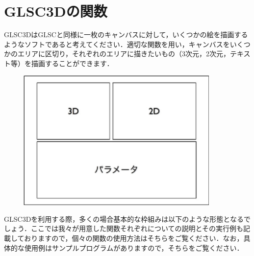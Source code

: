 \documentclass[platex,a4paper,12pt]{jsarticle}%
\begin{document}

\newpage
\section{GLSC3Dの関数}

GLSC3DはGLSCと同様に一枚のキャンバスに対して，いくつかの絵を描画するようなソフトであると考えてください．適切な関数を用い，キャンバスをいくつかのエリアに区切り，それぞれのエリアに描きたいもの（3次元，2次元，テキスト等）を描画することができます．
\begin{figure}[htb]
\centering
\includegraphics[width=100mm]{./Figures/eps/Canvas_kansu_gaiyo.eps}
\end{figure}

GLSC3Dを利用する際，多くの場合基本的な枠組みは以下のような形態となるでしょう．ここでは我々が用意した関数それぞれについての説明とその実行例も記載しておりますので，個々の関数の使用方法はそちらをご覧ください．なお，具体的な使用例はサンプルプログラムがありますので，そちらをご覧ください．\\
\end{document}
